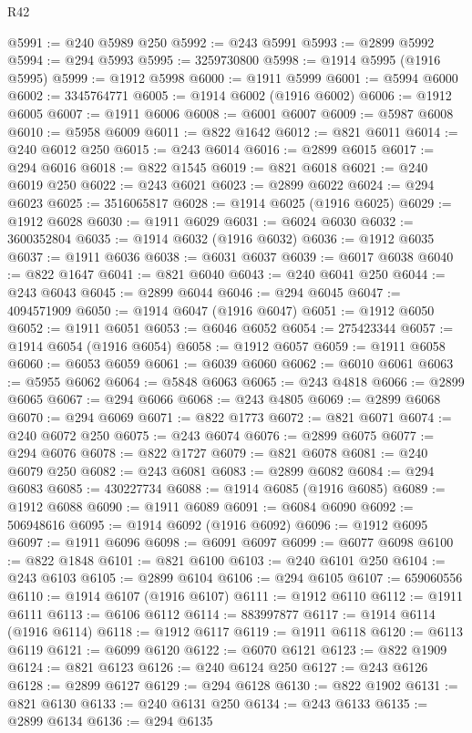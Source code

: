 \begin{lexlean}{R42}
\begin{coremodule}
{@5991 := @240 @5989 @250
@5992 := @243 @5991
@5993 := @2899 @5992
@5994 := @294 @5993
@5995 := 3259730800
@5998 := @1914 @5995 (@1916 @5995)
@5999 := @1912 @5998
@6000 := @1911 @5999
@6001 := @5994 @6000
@6002 := 3345764771
@6005 := @1914 @6002 (@1916 @6002)
@6006 := @1912 @6005
@6007 := @1911 @6006
@6008 := @6001 @6007
@6009 := @5987 @6008
@6010 := @5958 @6009
@6011 := @822 @1642
@6012 := @821 @6011
@6014 := @240 @6012 @250
@6015 := @243 @6014
@6016 := @2899 @6015
@6017 := @294 @6016
@6018 := @822 @1545
@6019 := @821 @6018
@6021 := @240 @6019 @250
@6022 := @243 @6021
@6023 := @2899 @6022
@6024 := @294 @6023
@6025 := 3516065817
@6028 := @1914 @6025 (@1916 @6025)
@6029 := @1912 @6028
@6030 := @1911 @6029
@6031 := @6024 @6030
@6032 := 3600352804
@6035 := @1914 @6032 (@1916 @6032)
@6036 := @1912 @6035
@6037 := @1911 @6036
@6038 := @6031 @6037
@6039 := @6017 @6038
@6040 := @822 @1647
@6041 := @821 @6040
@6043 := @240 @6041 @250
@6044 := @243 @6043
@6045 := @2899 @6044
@6046 := @294 @6045
@6047 := 4094571909
@6050 := @1914 @6047 (@1916 @6047)
@6051 := @1912 @6050
@6052 := @1911 @6051
@6053 := @6046 @6052
@6054 := 275423344
@6057 := @1914 @6054 (@1916 @6054)
@6058 := @1912 @6057
@6059 := @1911 @6058
@6060 := @6053 @6059
@6061 := @6039 @6060
@6062 := @6010 @6061
@6063 := @5955 @6062
@6064 := @5848 @6063
@6065 := @243 @4818
@6066 := @2899 @6065
@6067 := @294 @6066
@6068 := @243 @4805
@6069 := @2899 @6068
@6070 := @294 @6069
@6071 := @822 @1773
@6072 := @821 @6071
@6074 := @240 @6072 @250
@6075 := @243 @6074
@6076 := @2899 @6075
@6077 := @294 @6076
@6078 := @822 @1727
@6079 := @821 @6078
@6081 := @240 @6079 @250
@6082 := @243 @6081
@6083 := @2899 @6082
@6084 := @294 @6083
@6085 := 430227734
@6088 := @1914 @6085 (@1916 @6085)
@6089 := @1912 @6088
@6090 := @1911 @6089
@6091 := @6084 @6090
@6092 := 506948616
@6095 := @1914 @6092 (@1916 @6092)
@6096 := @1912 @6095
@6097 := @1911 @6096
@6098 := @6091 @6097
@6099 := @6077 @6098
@6100 := @822 @1848
@6101 := @821 @6100
@6103 := @240 @6101 @250
@6104 := @243 @6103
@6105 := @2899 @6104
@6106 := @294 @6105
@6107 := 659060556
@6110 := @1914 @6107 (@1916 @6107)
@6111 := @1912 @6110
@6112 := @1911 @6111
@6113 := @6106 @6112
@6114 := 883997877
@6117 := @1914 @6114 (@1916 @6114)
@6118 := @1912 @6117
@6119 := @1911 @6118
@6120 := @6113 @6119
@6121 := @6099 @6120
@6122 := @6070 @6121
@6123 := @822 @1909
@6124 := @821 @6123
@6126 := @240 @6124 @250
@6127 := @243 @6126
@6128 := @2899 @6127
@6129 := @294 @6128
@6130 := @822 @1902
@6131 := @821 @6130
@6133 := @240 @6131 @250
@6134 := @243 @6133
@6135 := @2899 @6134
@6136 := @294 @6135
}
\end{coremodule}
\end{lexlean}
